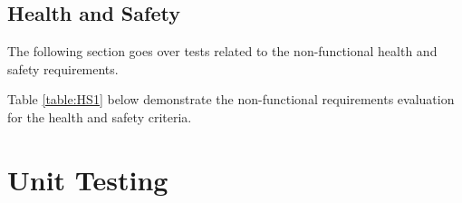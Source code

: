 \documentclass[12pt, titlepage]{article}
\begin{document}
\subsection{Health and Safety}

The following section goes over tests related to the non-functional health and safety requirements.


Table \ref{table:HS1} below demonstrate the non-functional requirements evaluation for the health and safety criteria.

\begin{table}[H]
\caption{\bf Non-Functional Requirements Evaluation Results for Health and Safety Testing}
\label{table:HS1}
\end{table}
\section{Unit Testing}
\end{document}
